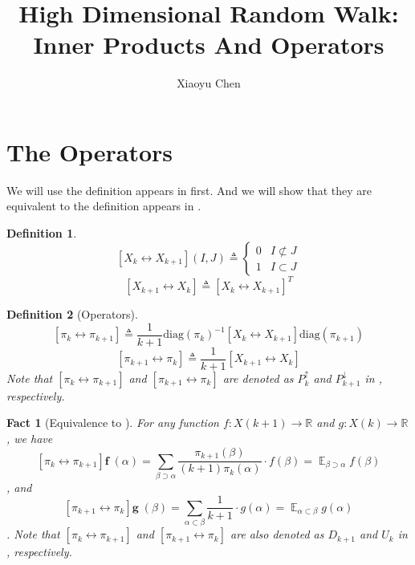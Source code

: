 \documentclass{article}
\title{High Dimensional Random Walk: Inner Products And Operators}
\author{Xiaoyu Chen}
\date{}
\newtheorem{define}{Definition}[section]
\newtheorem{fact}{Fact}[section]
\DeclareMathOperator*{\E}{\mathbb{E}}
\def\Op#1#2{\left[#1 \leftrightarrow #2\right]}
\begin{document}
\maketitle
{}


\section{The Operators}
We will use the definition appears in \cite{cryan2019modified} first.
And we will show that they are equivalent to the definition appears in \cite{alev2020improved}.
\begin{define}
  \[\Op{X_k}{X_{k+1}}(I, J) \triangleq \left\{
      \begin{array}{ll}
        0 & I \not\subset J \\
        1 & I \subset J
      \end{array}
    \right.\]
  \[\Op{X_{k+1}}{X_k} \triangleq \Op{X_k}{X_{k+1}}^T\]
\end{define}
\begin{define}[Operators]
  \[\Op{\pi_k}{\pi_{k+1}} \triangleq \frac{1}{k+1}\mathrm{diag}(\pi_k)^{-1} \Op{X_k}{X_{k+1}} \mathrm{diag}(\pi_{k+1}) \]
  \[\Op{\pi_{k+1}}{\pi_k} \triangleq \frac{1}{k+1} \Op{X_{k+1}}{X_k}\]
  Note that $\Op{\pi_k}{\pi_{k+1}}$ and $\Op{\pi_{k+1}}{\pi_k}$ are denoted as $P_k^{\uparrow}$ and $P_{k+1}^{\downarrow}$ in \cite{cryan2019modified}, respectively.
\end{define}
\begin{fact}[Equivalence to \cite{alev2020improved}]
  For any function $f: X(k+1) \to \mathbb{R}$ and $g: X(k)\to \mathbb{R}$, we have
  \[\Op{\pi_k}{\pi_{k+1}}\mathbf{f}\;(\alpha) = \sum_{\beta\supset\alpha} \frac{\pi_{k+1}(\beta)}{(k+1)\pi_k(\alpha)} \cdot f(\beta) = \E_{\beta\supset\alpha}f(\beta)\],
  and
  \[\Op{\pi_{k+1}}{\pi_k}\mathbf{g}\;(\beta) = \sum_{\alpha \subset \beta} \frac{1}{k+1} \cdot g(\alpha) = \E_{\alpha\subset \beta} g(\alpha)\].
  Note that $\Op{\pi_k}{\pi_{k+1}}$ and $\Op{\pi_{k+1}}{\pi_k}$ are also denoted as $D_{k+1}$ and $U_k$ in \cite{alev2020improved}, respectively.
\end{fact}
\end{document}
